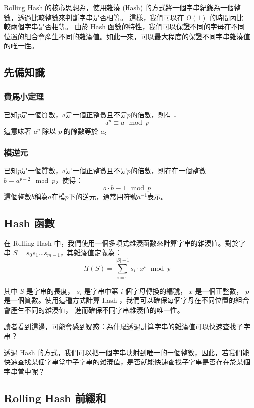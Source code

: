 Rolling Hash 的核心思想為，使用雜湊 (Hash) 的方式將一個字串紀錄為一個整數，透過比較整數來判斷字串是否相等。
這樣，我們可以在 $O(1)$ 的時間內比較兩個字串是否相等。
由於 Hash 函數的特性，我們可以保證不同的字母在不同位置的組合會產生不同的雜湊值。如此一來，可以最大程度的保證不同字串雜湊值的唯一性。

\subsection{先備知識}

\subsubsection{費馬小定理}

已知$p$是一個質數，$a$是一個正整數且不是$p$的倍數，則有：
$$a^p\equiv a \mod p$$
這意味著 $a^p$ 除以 $p$ 的餘數等於 $a$。

\subsubsection{模逆元}
已知$p$是一個質數，$a$是一個正整數且不是$p$的倍數，則存在一個整數$b = a^{p-2} \mod p$，使得：
$$a \cdot b \equiv 1 \mod p$$
這個整數$b$稱為$a$在模$p$下的逆元，通常用符號$a^{-1}$表示。

\subsection{Hash 函數}

在 Rolling Hash 中，我們使用一個多項式雜湊函數來計算字串的雜湊值。對於字串 $S = s_0 s_1 \ldots s_{m-1}$，其雜湊值定義為：
$$H(S)=\displaystyle\sum_{i=0}^{|S|-1} s_i \cdot x^i \mod p$$

其中 $S$ 是字串的長度， $s_i$ 是字串中第 $i$ 個字母轉換的編號， $x$ 是一個正整數， $p$ 是一個質數。使用這種方式計算 Hash ，我們可以確保每個字母在不同位置的組合會產生不同的雜湊值，
進而確保不同字串雜湊值的唯一性。

讀者看到這邊，可能會感到疑惑：為什麼透過計算字串的雜湊值可以快速查找子字串？

透過 Hash 的方式，我們可以把一個字串映射到唯一的一個整數，因此，若我們能快速查找某個字串當中子字串的雜湊值，是否就能快速查找子字串是否存在於某個字串當中呢？

\subsection{Rolling Hash 前綴和}

